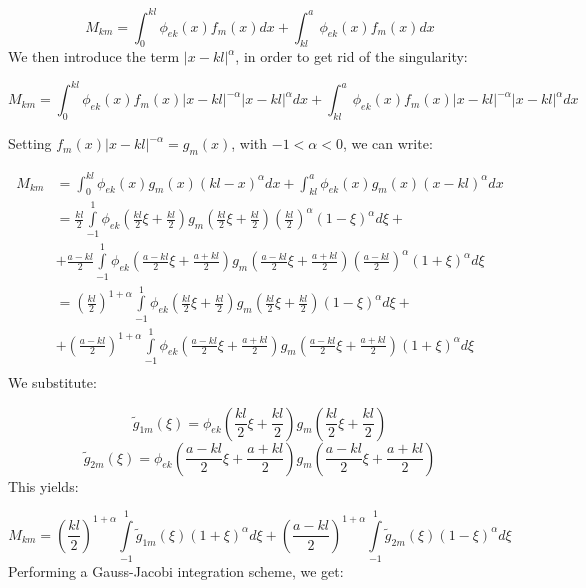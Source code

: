 \documentclass{article}
\begin{document}
\begin{equation*}
    M_{km} = \int_0^{kl} \phi_{ek} (x)f_m(x)dx + \int_{kl}^a \phi_{ek} (x)f_m(x)dx
\end{equation*}
We then introduce the term $|x - kl|^{\alpha}$, in order to get rid of the singularity:

\begin{equation*}
    M_{km} = \int_0^{kl} \phi_{ek} (x)f_m(x)|x - kl|^{-\alpha}|x - kl|^{\alpha}dx + \int_{kl}^a \phi_{ek} (x)f_m(x)|x - kl|^{-\alpha}|x - kl|^{\alpha}dx
\end{equation*}


Setting $f_m(x) |x-kl|^{-\alpha} = g_m(x)$, with $-1<\alpha<0$, we can write:

\begin{align*}
    M_{km} &= \int_0^{kl} \phi_{ek} (x)g_m(x)(kl-x)^{\alpha}dx + \int_{kl}^a \phi_{ek} (x)g_m(x)(x - kl)^{\alpha}dx\\
    &= \frac{kl}{2}\int\limits_{-1}^1 \phi_{ek}\left(\frac{kl}{2}\xi + \frac{kl}{2}\right)g_m\left(\frac{kl}{2}\xi + \frac{kl}{2}\right) \left(\frac{kl}{2}\right)^{\alpha}(1-\xi)^{\alpha}d\xi + \\
    &+ \frac{a-kl}{2} \int\limits_{-1}^1\phi_{ek}\left(\frac{a-kl}{2}\xi + \frac{a+kl}{2}\right)g_m\left(\frac{a-kl}{2}\xi + \frac{a+kl}{2}\right) \left(\frac{a-kl}{2}\right)^{\alpha}(1+\xi)^{\alpha}d\xi \\
    &= \left(\frac{kl}{2}\right)^{1+\alpha} \int\limits_{-1}^{1}\phi_{ek}\left(\frac{kl}{2}\xi + \frac{kl}{2}\right)g_m\left(\frac{kl}{2}\xi + \frac{kl}{2}\right)(1-\xi)^{\alpha}d\xi + \\
    &+ \left(\frac{a-kl}{2}\right)^{1 + \alpha} \int\limits_{-1}^1\phi_{ek}\left(\frac{a-kl}{2}\xi + \frac{a+kl}{2}\right)g_m\left(\frac{a-kl}{2}\xi + \frac{a+kl}{2}\right) (1+\xi)^{\alpha}d\xi \\
\end{align*}
We substitute:

\begin{equation*}
    \tilde g_{1m}(\xi) = \phi_{ek}\left(\frac{kl}{2}\xi + \frac{kl}{2}\right)g_m\left(\frac{kl}{2}\xi + \frac{kl}{2}\right)
\end{equation*}
\begin{equation*}
    \tilde g_{2m}(\xi) = \phi_{ek}\left(\frac{a-kl}{2}\xi + \frac{a+kl}{2}\right)g_m\left(\frac{a-kl}{2}\xi + \frac{a+kl}{2}\right)
\end{equation*}
This yields:

\begin{equation}
    M_{km} = \left(\frac{kl}{2}\right)^{1+\alpha} \int\limits_{-1}^{1} \tilde g_{1m}(\xi) (1+\xi)^{\alpha}d\xi + \left(\frac{a-kl}{2}\right)^{1 + \alpha}\int\limits_{-1}^{1} \tilde g_{2m}(\xi) (1-\xi)^{\alpha}d\xi
\end{equation}
Performing a Gauss-Jacobi integration scheme, we get:
\end{document}
